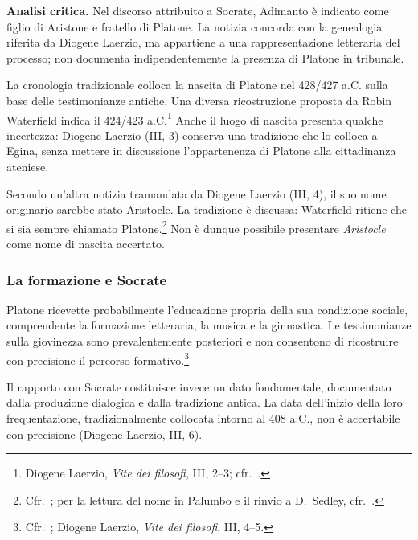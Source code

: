 
\noindent\textbf{Analisi critica.}
Nel discorso attribuito a Socrate, Adimanto è indicato come figlio di Aristone e fratello di Platone. La notizia concorda con la genealogia riferita da Diogene Laerzio, ma appartiene a una rappresentazione letteraria del processo; non documenta indipendentemente la presenza di Platone in tribunale.

La cronologia tradizionale colloca la nascita di Platone nel 428/427 a.C. sulla base delle testimonianze antiche. Una diversa ricostruzione proposta da Robin Waterfield indica il 424/423 a.C.\footnote{Diogene Laerzio, \emph{Vite dei filosofi}, III, 2--3; cfr.\ \cite[cap.~1]{waterfield2023}.} Anche il luogo di nascita presenta qualche incertezza: Diogene Laerzio (III, 3) conserva una tradizione che lo colloca a Egina, senza mettere in discussione l'appartenenza di Platone alla cittadinanza ateniese.

Secondo un'altra notizia tramandata da Diogene Laerzio (III, 4), il suo nome originario sarebbe stato Aristocle. La tradizione è discussa: Waterfield ritiene che si sia sempre chiamato Platone.\footnote{Cfr.\ \cite[cap.~1]{waterfield2023}; per la lettura del nome in Palumbo e il rinvio a D.\ Sedley, cfr.\ \cite[94]{palumbo2015}.} Non è dunque possibile presentare \emph{Aristocle} come nome di nascita accertato.

\subsubsection{La formazione e Socrate}

Platone ricevette probabilmente l'educazione propria della sua condizione sociale, comprendente la formazione letteraria, la musica e la ginnastica. Le testimonianze sulla giovinezza sono prevalentemente posteriori e non consentono di ricostruire con precisione il percorso formativo.\footnote{Cfr.\ \cite[94]{palumbo2015}; Diogene Laerzio, \emph{Vite dei filosofi}, III, 4--5.}

Il rapporto con Socrate costituisce invece un dato fondamentale, documentato dalla produzione dialogica e dalla tradizione antica. La data dell'inizio della loro frequentazione, tradizionalmente collocata intorno al 408 a.C., non è accertabile con precisione (Diogene Laerzio, III, 6).

